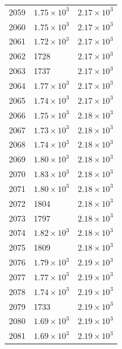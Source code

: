 \begin{table}[H]
\begin{tabular}{lll}
2059 & $\displaystyle 1.75 \times 10^{3}$ & $\displaystyle 2.17 \times 10^{3}$ \\
2060 & $\displaystyle 1.75 \times 10^{3}$ & $\displaystyle 2.17 \times 10^{3}$ \\
2061 & $\displaystyle 1.72 \times 10^{3}$ & $\displaystyle 2.17 \times 10^{3}$ \\
2062 & 1728 & $\displaystyle 2.17 \times 10^{3}$ \\
2063 & 1737 & $\displaystyle 2.17 \times 10^{3}$ \\
2064 & $\displaystyle 1.77 \times 10^{3}$ & $\displaystyle 2.17 \times 10^{3}$ \\
2065 & $\displaystyle 1.74 \times 10^{3}$ & $\displaystyle 2.17 \times 10^{3}$ \\
2066 & $\displaystyle 1.75 \times 10^{3}$ & $\displaystyle 2.18 \times 10^{3}$ \\
2067 & $\displaystyle 1.73 \times 10^{3}$ & $\displaystyle 2.18 \times 10^{3}$ \\
2068 & $\displaystyle 1.74 \times 10^{3}$ & $\displaystyle 2.18 \times 10^{3}$ \\
2069 & $\displaystyle 1.80 \times 10^{3}$ & $\displaystyle 2.18 \times 10^{3}$ \\
2070 & $\displaystyle 1.83 \times 10^{3}$ & $\displaystyle 2.18 \times 10^{3}$ \\
2071 & $\displaystyle 1.80 \times 10^{3}$ & $\displaystyle 2.18 \times 10^{3}$ \\
2072 & 1804 & $\displaystyle 2.18 \times 10^{3}$ \\
2073 & 1797 & $\displaystyle 2.18 \times 10^{3}$ \\
2074 & $\displaystyle 1.82 \times 10^{3}$ & $\displaystyle 2.18 \times 10^{3}$ \\
2075 & 1809 & $\displaystyle 2.18 \times 10^{3}$ \\
2076 & $\displaystyle 1.79 \times 10^{3}$ & $\displaystyle 2.19 \times 10^{3}$ \\
2077 & $\displaystyle 1.77 \times 10^{3}$ & $\displaystyle 2.19 \times 10^{3}$ \\
2078 & $\displaystyle 1.74 \times 10^{3}$ & $\displaystyle 2.19 \times 10^{3}$ \\
2079 & 1733 & $\displaystyle 2.19 \times 10^{3}$ \\
2080 & $\displaystyle 1.69 \times 10^{3}$ & $\displaystyle 2.19 \times 10^{3}$ \\
2081 & $\displaystyle 1.69 \times 10^{3}$ & $\displaystyle 2.19 \times 10^{3}$ \\

\end{tabular}
\end{table}
